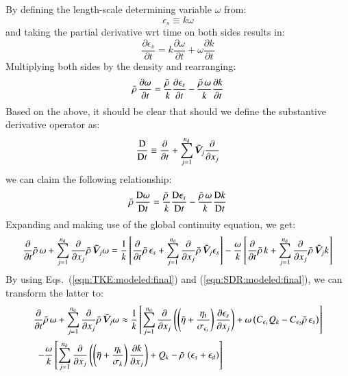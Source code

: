 \documentclass{warpdoc}
\newcommand{\alb}{\vspace{0.2cm}\\} %
\newcommand{\nd}{{{n}_{\rm d}}}
\newcommand{\turb}{_{\rm t}}
\newcommand{\etat}{{\eta\turb}}
\newcommand{\mfd}{\displaystyle}
\begin{document}
By defining the length-scale determining variable $\omega$ from:
%
\begin{equation}
  \epsilon_s \equiv k \omega
  \label{eqn:omega}
\end{equation}
%
and taking the partial derivative wrt time on both sides results in:
%
\begin{equation}
  \frac{\partial \epsilon_s}{\partial t}
   =  k \frac{\partial \omega}{\partial t}
    +\omega \frac{\partial k}{\partial t}
\end{equation}
%
Multiplying both sides by the density and rearranging:
%
\begin{equation}
  \bar{\rho}\,  \frac{\partial \omega}{\partial t}
   = 
  \frac{\bar{\rho}\,}{k} \frac{\partial \epsilon_s}{\partial t}
  -\frac{\bar{\rho}\, \omega}{k} \frac{\partial k}{\partial t}
\end{equation}
%
Based on the above, it should be clear that should we define
the substantive derivative operator as:
%
\begin{equation}
  \frac{{\rm D}}{{\rm D}t} \equiv 
   \frac{\partial}{\partial t} + \sum_{j=1}^\nd {\wtilde{\bm{V}}_j} \frac{\partial}{\partial x_j}
\end{equation}
%
we can claim the following relationship:
%
\begin{equation}
  \bar{\rho}\,  \frac{{\rm D} \omega}{{\rm D} t}
   = 
  \frac{\bar{\rho}\,}{k} \frac{{\rm D} \epsilon_s}{{\rm D} t}
  -\frac{\bar{\rho}\, \omega}{k} \frac{{\rm D} k}{{\rm D} t}
\end{equation}
%
Expanding and making use of the global continuity equation, we get:
%
\begin{equation}
  \frac{\partial }{\partial t}\wbar{\rho}\,\omega+\sum_{j=1}^\nd \frac{\partial}{\partial x_j} \wbar{\rho}\, {\wtilde{\bm{V}}_j} \omega
   = 
  \frac{1}{k}\left[ \frac{\partial }{\partial t}\wbar{\rho}\,\epsilon_s+\sum_{j=1}^\nd \frac{\partial}{\partial x_j} \wbar{\rho}\, {\wtilde{\bm{V}}_j} \epsilon_s\right]
  -\frac{\omega}{k}\left[ \frac{\partial }{\partial t}\wbar{\rho}\,k+\sum_{j=1}^\nd \frac{\partial}{\partial x_j} \wbar{\rho}\, {\wtilde{\bm{V}}_j} k\right]
 \label{eqn:SPDR:modeled:1}
\end{equation}
%
By using Eqs.\ (\ref{eqn:TKE:modeled:final}) and (\ref{eqn:SDR:modeled:final}),
we can transform the latter to:
%
\begin{equation}
  \begin{array}{l}
    \mfd\frac{\partial }{\partial t}\wbar{\rho}\,\omega+\sum_{j=1}^\nd \frac{\partial}{\partial x_j} \wbar{\rho}\, {\wtilde{\bm{V}}_j} \omega
       \approx 
      \frac{1}{k}\left[
            \sum_{j=1}^\nd \frac{\partial }{\partial x_j} \left(\left( \wbar{\eta} +\frac{\etat}{\sigma_{\epsilon_s}} \right)\frac{\partial \epsilon_s}{\partial x_j} \right)
           +\omega \left( C_{\epsilon_1}  Q_k - C_{\epsilon_2} \wbar{\rho}\, \epsilon_s   \right)
      \right]
  \alb~~
  -\mfd\frac{\omega}{k}\left[
     \sum_{j=1}^{\nd} \frac{\partial }{\partial x_j}
     \left( \left( \wbar{\eta}+\frac{\etat}{\sigma_k} \right) \frac{\partial k}{\partial x_j} \right)
     +Q_k-\wbar{\rho}\, \left( \epsilon_s+\epsilon_d \right)
   \right]
  \end{array}
 \label{eqn:SPDR:modeled:2}
\end{equation}
\end{document}
